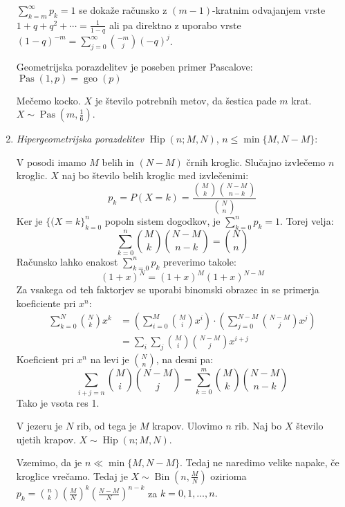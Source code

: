 \documentclass[12pt]{book}
\def\s{\vspace{10pt}}
\theoremstyle{definition}
\theoremstyle{plain}
\theoremstyle{plain}
\theoremstyle{plain}
\theoremstyle{remark}
\begin{document}
\begin{enumerate}
    $\sum_{k=m}^{\infty} p_k = 1$ se dokaže računsko z $(m-1)$-kratnim odvajanjem vrste $1+q+q^2+ \cdots = \frac{1}{1-q}$ ali pa direktno z uporabo vrste $(1-q)^{-m}=\sum_{j=0}^{\infty}\binom{-m}{j} (-q)^j$. \s
    
    Geometrijska porazdelitev je poseben primer Pascalove: $\operatorname{Pas}(1,p) = \operatorname{geo}(p)$

    \begin{zgled}
        Mečemo kocko. $X$ je število potrebnih metov, da šestica pade $m$ krat. $X \sim \operatorname{Pas}(m, \frac{1}{6})$.
    \end{zgled}

    \item \emph{Hipergeometrijska porazdelitev} $\operatorname{Hip}(n; M, N)$, $n \leq \min \{M, N-M\}$:
    
    V posodi imamo $M$ belih in $(N-M)$ črnih kroglic. Slučajno izvlečemo $n$ kroglic. $X$ naj bo število belih kroglic med izvlečenimi:
    $$
    p_k=P(X=k)=\frac{\binom{M}{k} \binom{N-M}{n-k}}{\binom{N}{n}}
    $$
    Ker je $\{(X=k\}_{k=0}^n$ popoln sistem dogodkov, je $\sum_{k=0}^n p_k=1$. Torej velja:
    $$
    \sum_{k=0}^{n} \binom{M}{k} \binom{N-M}{n-k} = \binom{N}{n}
    $$
    Računsko lahko enakost $\sum_{k=0}^n p_k$ preverimo takole: 
    $$
    (1+x)^N=(1+x)^M(1+x)^{N-M}
    $$
    Za vsakega od teh faktorjev se uporabi binomski obrazec in se primerja koeficiente pri $x^n$:
    $$
    \begin{aligned}
        \sum_{k=0}^N \binom{N}{k} x^k&=\left(\sum_{i=0}^M \binom{M}{i} x^i\right) \cdot\left(\sum_{j=0}^{N-M} \binom{N-M}{j} x^j\right) \\
        &=\sum_i \sum_j \binom{M}{i}\binom{N-M}{j} x^{i+j}
    \end{aligned}
    $$
    Koeficient pri $x^n$ na levi je $\binom{N}{n}$, na desni pa: 
    $$
    \sum_{i+j=n}\binom{M}{i}\binom{N-M}{j}=\sum_{k=0}^m\binom{M}{k}\binom{N-M}{n-k}
    $$
    Tako je vsota res 1. 

    \begin{zgled}
        V jezeru je $N$ rib, od tega je $M$ krapov. Ulovimo $n$ rib. Naj bo $X$ število ujetih krapov. $X \sim \operatorname{Hip}(n;M,N)$.
    \end{zgled}

    Vzemimo, da je $n \ll \min\{M, N-M\}$. Tedaj ne naredimo velike napake, če kroglice vrečamo. Tedaj je $X \sim \operatorname{Bin}(n, \frac{M}{N})$ ozirioma $p_k = \binom{n}{k} \left(\frac{M}{N}\right)^k \left(\frac{N-M}{N}\right)^{n-k}$ za $k=0, 1, \ldots , n.$

\end{enumerate}
\end{document}
